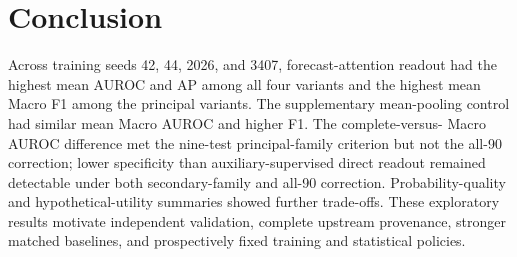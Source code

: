 \section{Conclusion}
Across training seeds 42, 44, 2026, and 3407, forecast-attention readout had the highest mean AUROC and AP among all four variants and the highest mean Macro F1 among the principal variants. The supplementary mean-pooling control had similar mean Macro AUROC and higher F1. The complete-versus-\nojepa{} Macro AUROC difference met the nine-test principal-family criterion but not the all-90 correction; lower specificity than auxiliary-supervised direct readout remained detectable under both secondary-family and all-90 correction. Probability-quality and hypothetical-utility summaries showed further trade-offs. These exploratory results motivate independent validation, complete upstream provenance, stronger matched baselines, and prospectively fixed training and statistical policies.
